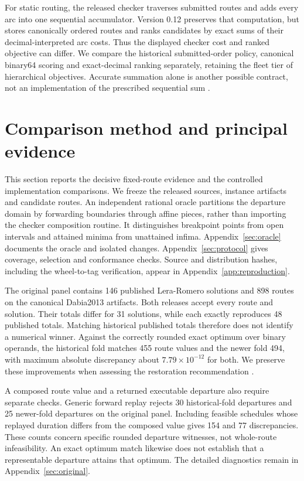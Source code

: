 \documentclass[11pt]{article}
\begin{document}
For static routing, the released checker traverses submitted routes and adds every arc into one sequential accumulator. Version 0.12 preserves that computation, but stores canonically ordered routes and ranks candidates by exact sums of their decimal-interpreted arc costs. Thus the displayed checker cost and ranked objective can differ. We compare the historical submitted-order policy, canonical binary64 scoring and exact-decimal ranking separately, retaining the fleet tier of hierarchical objectives. Accurate summation alone is another possible contract, not an implementation of the prescribed sequential sum \autocite{pythonFsum2026,ogitaAccurateSum2005}.

\section{Comparison method and principal evidence}\label{sec:main-evidence}

This section reports the decisive fixed-route evidence and the controlled implementation comparisons. We freeze the released sources, instance artifacts and candidate routes. An independent rational oracle partitions the departure domain by forwarding boundaries through affine pieces, rather than importing the checker composition routine. It distinguishes breakpoint points from open intervals and attained minima from unattained infima. Appendix~\ref{sec:oracle} documents the oracle and isolated changes. Appendix~\ref{sec:protocol} gives coverage, selection and conformance checks. Source and distribution hashes, including the wheel-to-tag verification, appear in Appendix~\ref{app:reproduction}.

The original panel contains 146 published Lera-Romero solutions and 898 routes on the canonical Dabia2013 artifacts. Both releases accept every route and solution. Their totals differ for 31 solutions, while each exactly reproduces 48 published totals. Matching historical published totals therefore does not identify a numerical winner. Against the correctly rounded exact optimum over binary operands, the historical fold matches 455 route values and the newer fold 494, with maximum absolute discrepancy about $7.79\times10^{-12}$ for both. We preserve these improvements when assessing the restoration recommendation \autocite{lera-romeroLinearEdgeCosts2020,dabiaBranchPriceTimeDependent2013,onyrInvestigation2026}.

A composed route value and a returned executable departure also require separate checks. Generic forward replay rejects 30 historical-fold departures and 25 newer-fold departures on the original panel. Including feasible schedules whose replayed duration differs from the composed value gives 154 and 77 discrepancies. These counts concern specific rounded departure witnesses, not whole-route infeasibility. An exact optimum match likewise does not establish that a representable departure attains that optimum. The detailed diagnostics remain in Appendix~\ref{sec:original}.
\end{document}
